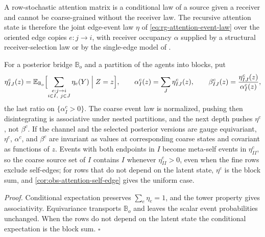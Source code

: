 A row-stochastic attention matrix is a conditional law of a source given a receiver
and cannot be coarse-grained without the receiver law. The recursive attention state
is therefore the joint edge-event law $\eta$ of \eqref{eq:rg-attention-event-law}
over the oriented edge copies $e:j\to i$, with receiver occupancy $\alpha$ supplied
by a structural receiver-selection law or by the single-edge model of
.

For a posterior bridge $\mathbb B_o$ and a partition of the agents into blocks, put
\begin{equation}
\eta^c_{IJ}(z)
=\mathbb E_{\mathbb B_o}\Bigl[\sum_{\substack{e:j\to i\\ i\in I,\ j\in J}}\eta_e(Y)\Bigm|Z=z\Bigr],
\qquad
\alpha^c_I(z)=\sum_J\eta^c_{IJ}(z),
\qquad
\beta^c_{IJ}(z)=\frac{\eta^c_{IJ}(z)}{\alpha^c_I(z)},
\label{eq:rg-meta-attention}
\end{equation}
the last ratio on $\{\alpha^c_I>0\}$. The coarse event law is normalized, pushing
then disintegrating is associative under nested partitions, and the next depth
pushes $\eta^c$, not $\beta^c$. If the channel and the selected posterior versions
are gauge equivariant, $\eta^c$, $\alpha^c$, and $\beta^c$ are invariant as values at
corresponding coarse states and covariant as functions of $z$. Events with both
endpoints in $I$ become meta-self events in $\eta^c_{II}$, so the coarse source set
of $I$ contains $I$ whenever $\eta^c_{II}>0$, even when the fine rows exclude
self-edges; for rows that do not depend on the latent state, $\eta^c$ is the block
sum, and \cref{cor:obs-attention-self-edge} gives the uniform case.

\noindent\emph{Proof.}
Conditional expectation preserves $\sum_e\eta_e=1$, and the tower property gives
associativity. Equivariance transports $\mathbb B_o$ and leaves the scalar event
probabilities unchanged. When the rows do not depend on the latent state the
conditional expectation is the block sum. $\square$

